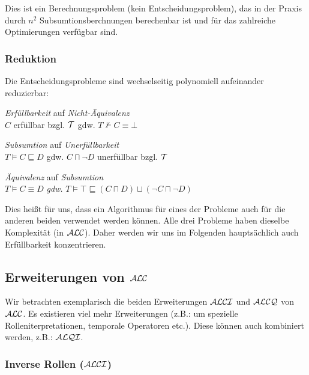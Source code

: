 Dies ist ein Berechnungsproblem (kein Entscheidungsproblem), das in der Praxis durch $n^2$ Subsumtionsberchnungen berechenbar ist und für das zahlreiche Optimierungen verfügbar sind.

\subsubsection{Reduktion}

Die Entscheidungsprobleme sind wechselseitig polynomiell aufeinander reduzierbar:

\begin{lemma}
\begin{enumerate}
\item{\emph{Erfüllbarkeit} auf \emph{Nicht-Äquivalenz} \\
$C$ erfüllbar bzgl. $\mathcal{T}$ gdw. $T \not\vDash C \equiv \bot$}
\item{\emph{Subsumtion} auf \emph{Unerfüllbarkeit} \\
$T \vDash C \sqsubseteq D$ gdw. $C \sqcap \neg D$ unerfüllbar bzgl.
$\mathcal{T}$
\item{\emph{Äquivalenz} auf \emph{Subsumtion} \\}
$T \vDash C \equiv D$ \emph{gdw.} $T \vDash \top \sqsubseteq \left( C \sqcap D \right) \sqcup \left( \neg C \sqcap \neg D \right)$}
\end{enumerate}
\end{lemma}

Dies heißt für uns, dass ein Algorithmus für eines der Probleme auch für die anderen beiden verwendet werden können. Alle drei Probleme haben dieselbe Komplexität (in $\mathcal{A}\mathcal{L}\mathcal{C}$). Daher werden wir uns im Folgenden hauptsächlich auch Erfüllbarkeit konzentrieren.

\subsection{Erweiterungen von \texorpdfstring{$\mathcal{A}\mathcal{L}\mathcal{C}$}{ALC}}\label{erweiterungen-von-alc}

Wir betrachten exemplarisch die beiden Erweiterungen $\mathcal{A}\mathcal{L}\mathcal{C}\mathcal{I}$ und $\mathcal{A}\mathcal{L}\mathcal{C}\mathcal{Q}$ von $\mathcal{A}\mathcal{L}\mathcal{C}$. Es existieren viel mehr Erweiterungen (z.B.: um spezielle Rolleniterpretationen, temporale Operatoren etc.). Diese können auch kombiniert werden, z.B.: $\mathcal{A}\mathcal{L}\mathcal{Q}\mathcal{I}$.

\subsubsection{Inverse Rollen (\texorpdfstring{$\mathcal{A}\mathcal{L}\mathcal{C}\mathcal{I}$}{ALCI})}\label{inverse-rollen-alci}

